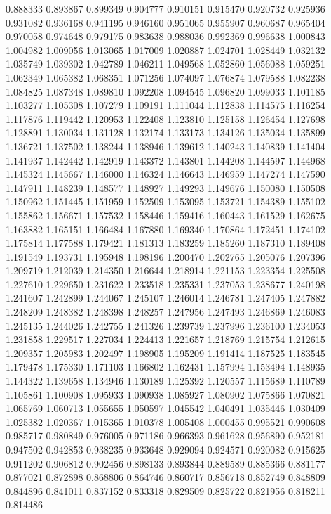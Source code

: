 0.888333
0.893867
0.899349
0.904777
0.910151
0.915470
0.920732
0.925936
0.931082
0.936168
0.941195
0.946160
0.951065
0.955907
0.960687
0.965404
0.970058
0.974648
0.979175
0.983638
0.988036
0.992369
0.996638
1.000843
1.004982
1.009056
1.013065
1.017009
1.020887
1.024701
1.028449
1.032132
1.035749
1.039302
1.042789
1.046211
1.049568
1.052860
1.056088
1.059251
1.062349
1.065382
1.068351
1.071256
1.074097
1.076874
1.079588
1.082238
1.084825
1.087348
1.089810
1.092208
1.094545
1.096820
1.099033
1.101185
1.103277
1.105308
1.107279
1.109191
1.111044
1.112838
1.114575
1.116254
1.117876
1.119442
1.120953
1.122408
1.123810
1.125158
1.126454
1.127698
1.128891
1.130034
1.131128
1.132174
1.133173
1.134126
1.135034
1.135899
1.136721
1.137502
1.138244
1.138946
1.139612
1.140243
1.140839
1.141404
1.141937
1.142442
1.142919
1.143372
1.143801
1.144208
1.144597
1.144968
1.145324
1.145667
1.146000
1.146324
1.146643
1.146959
1.147274
1.147590
1.147911
1.148239
1.148577
1.148927
1.149293
1.149676
1.150080
1.150508
1.150962
1.151445
1.151959
1.152509
1.153095
1.153721
1.154389
1.155102
1.155862
1.156671
1.157532
1.158446
1.159416
1.160443
1.161529
1.162675
1.163882
1.165151
1.166484
1.167880
1.169340
1.170864
1.172451
1.174102
1.175814
1.177588
1.179421
1.181313
1.183259
1.185260
1.187310
1.189408
1.191549
1.193731
1.195948
1.198196
1.200470
1.202765
1.205076
1.207396
1.209719
1.212039
1.214350
1.216644
1.218914
1.221153
1.223354
1.225508
1.227610
1.229650
1.231622
1.233518
1.235331
1.237053
1.238677
1.240198
1.241607
1.242899
1.244067
1.245107
1.246014
1.246781
1.247405
1.247882
1.248209
1.248382
1.248398
1.248257
1.247956
1.247493
1.246869
1.246083
1.245135
1.244026
1.242755
1.241326
1.239739
1.237996
1.236100
1.234053
1.231858
1.229517
1.227034
1.224413
1.221657
1.218769
1.215754
1.212615
1.209357
1.205983
1.202497
1.198905
1.195209
1.191414
1.187525
1.183545
1.179478
1.175330
1.171103
1.166802
1.162431
1.157994
1.153494
1.148935
1.144322
1.139658
1.134946
1.130189
1.125392
1.120557
1.115689
1.110789
1.105861
1.100908
1.095933
1.090938
1.085927
1.080902
1.075866
1.070821
1.065769
1.060713
1.055655
1.050597
1.045542
1.040491
1.035446
1.030409
1.025382
1.020367
1.015365
1.010378
1.005408
1.000455
0.995521
0.990608
0.985717
0.980849
0.976005
0.971186
0.966393
0.961628
0.956890
0.952181
0.947502
0.942853
0.938235
0.933648
0.929094
0.924571
0.920082
0.915625
0.911202
0.906812
0.902456
0.898133
0.893844
0.889589
0.885366
0.881177
0.877021
0.872898
0.868806
0.864746
0.860717
0.856718
0.852749
0.848809
0.844896
0.841011
0.837152
0.833318
0.829509
0.825722
0.821956
0.818211
0.814486
